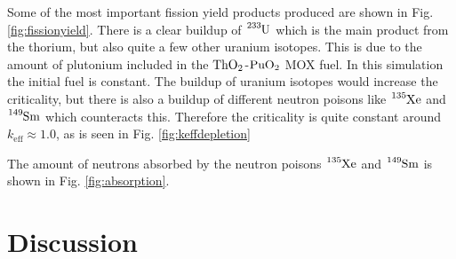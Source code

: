 \documentclass[norsk,a4paper,12pt]{article}
\begin{document}
\begin{multicols}{2}
Some of the most important fission yield products produced are shown in Fig. \ref{fig:fissionyield}. There is a clear buildup of $\ce{^{233}U}$ which is the main product from the thorium, but also quite a few other uranium isotopes. This is due to the amount of plutonium included in the $\ce{ThO_2}$-$\ce{PuO_2}$ MOX fuel. In this simulation the initial fuel is constant. The buildup of uranium isotopes would increase the criticality, but there is also a buildup of different neutron poisons like $\ce{^{135}Xe}$ and $\ce{^{149}Sm}$ which counteracts this. Therefore the criticality is quite constant around $k_{\text{eff}} \approx 1.0$, as is seen in Fig. \ref{fig:keffdepletion} 


The amount of neutrons absorbed by the neutron poisons $\ce{^{135}Xe}$ and $\ce{^{149}Sm}$ is shown in Fig. \ref{fig:absorption}.


\section{Discussion}


\end{multicols}
\end{document}
